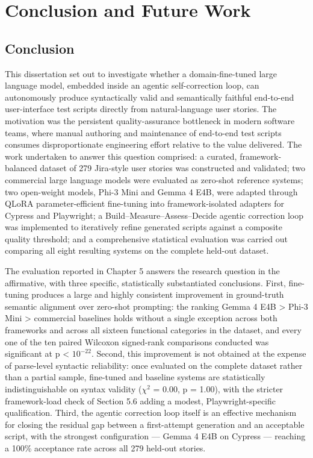 \chapter{Conclusion and Future Work}

\section{Conclusion}

This dissertation set out to investigate whether a domain-fine-tuned
large language model, embedded inside an agentic self-correction loop,
can autonomously produce syntactically valid and semantically faithful
end-to-end user-interface test scripts directly from natural-language
user stories. The motivation was the persistent quality-assurance
bottleneck in modern software teams, where manual authoring and
maintenance of end-to-end test scripts consumes disproportionate
engineering effort relative to the value delivered. The work undertaken
to answer this question comprised: a curated, framework-balanced
dataset of 279 Jira-style user stories was constructed and validated;
two commercial large language models were evaluated as zero-shot
reference systems; two open-weight models, Phi-3 Mini and Gemma 4 E4B,
were adapted through QLoRA parameter-efficient fine-tuning into
framework-isolated adapters for Cypress and Playwright; a
Build--Measure--Assess--Decide agentic correction loop was implemented
to iteratively refine generated scripts against a composite quality
threshold; and a comprehensive statistical evaluation was carried out
comparing all eight resulting systems on the complete held-out dataset.

The evaluation reported in Chapter 5 answers the research question in
the affirmative, with three specific, statistically substantiated
conclusions. First, fine-tuning produces a large and highly consistent
improvement in ground-truth semantic alignment over zero-shot prompting:
the ranking Gemma 4 E4B \textgreater{} Phi-3 Mini \textgreater{}
commercial baselines holds without a single exception across both
frameworks and across all sixteen functional categories in the dataset,
and every one of the ten paired Wilcoxon signed-rank comparisons
conducted was significant at p \textless{} $10^{-22}$. Second, this
improvement is not obtained at the expense of parse-level syntactic
reliability: once evaluated on the complete dataset rather than a
partial sample, fine-tuned and baseline systems are statistically
indistinguishable on syntax validity ($\chi^2$ = 0.00, p = 1.00), with
the stricter framework-load check of Section 5.6 adding a modest,
Playwright-specific qualification. Third, the agentic correction
loop itself is an effective mechanism for closing the residual gap
between a first-attempt generation and an acceptable script, with the
strongest configuration --- Gemma 4 E4B on Cypress --- reaching a 100\%
acceptance rate across all 279 held-out stories.


